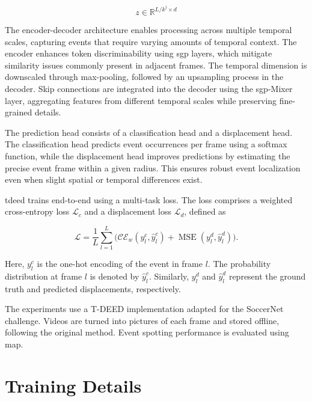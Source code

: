 \[
z \in \mathbb{R}^{L/{k^j \times d} }
\]

The encoder-decoder architecture enables processing across multiple temporal scales, capturing events that require varying amounts of temporal context. The encoder enhances token discriminability using \acrfull{sgp} layers, which mitigate similarity issues commonly present in adjacent frames. The temporal dimension is downscaled through max-pooling, followed by an upsampling process in the decoder. Skip connections are integrated into the decoder using the \acrshort{sgp}-Mixer layer, aggregating features from different temporal scales while preserving fine-grained details.

The prediction head consists of a classification head and a displacement head. The classification head predicts event occurrences per frame using a softmax function, while the displacement head improves predictions by estimating the precise event frame within a given radius. This ensures robust event localization even when slight spatial or temporal differences exist.


\acrshort{tdeed} trains end-to-end using a multi-task loss. The loss comprises a weighted cross-entropy loss \(\mathcal{L}_c\) and a displacement loss \(\mathcal{L}_d\), defined as

\[
\mathcal{L} = \frac{1}{L}\sum_{l=1}^{L}\Big(\mathcal{CE}_{w}(y_l^{c},\hat{y}_l^c) + \operatorname{MSE}(y_l^{d},\hat{y}_l^d)\Big).
\]

Here, \(y_l^{c}\) is the one-hot encoding of the event in frame \(l\). The probability distribution at frame \(l\) is denoted by \(\hat{y}_l^c\). Similarly, \(y_l^{d}\) and \(\hat{y}_l^d\) represent the ground truth and predicted displacements, respectively.

The experiments use a T-DEED implementation adapted for the SoccerNet challenge. Videos are turned into pictures of each frame and stored offline, following the original method. Event spotting performance is evaluated using \acrlong{map}.


\section{Training Details} \todo


